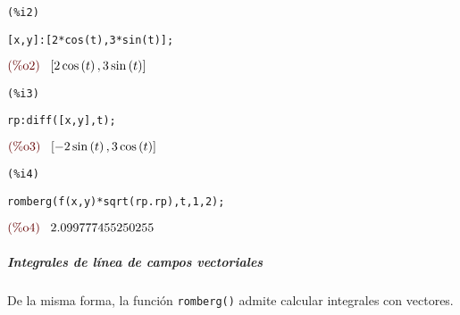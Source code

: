 \documentclass[12pt]{article}
\begin{document}
\noindent
\begin{minipage}[t]{8ex}{\color{red}\bf
\begin{verbatim}
(%i2) 
\end{verbatim}}
\end{minipage}
\begin{minipage}[t]{\textwidth}{\color{blue}
\begin{verbatim}
[x,y]:[2*cos(t),3*sin(t)];
\end{verbatim}}
\end{minipage}
\begin{math}\displaystyle
\parbox{8ex}{\color{labelcolor}(\%o2) }
[2\,\mathrm{cos}\left( t\right) ,3\,\mathrm{sin}\left( t\right) ]
\end{math}


\noindent
\begin{minipage}[t]{8ex}{\color{red}\bf
\begin{verbatim}
(%i3) 
\end{verbatim}}
\end{minipage}
\begin{minipage}[t]{\textwidth}{\color{blue}
\begin{verbatim}
rp:diff([x,y],t);
\end{verbatim}}
\end{minipage}
\begin{math}\displaystyle
\parbox{8ex}{\color{labelcolor}(\%o3) }
[-2\,\mathrm{sin}\left( t\right) ,3\,\mathrm{cos}\left( t\right) ]
\end{math}


\noindent
\begin{minipage}[t]{8ex}{\color{red}\bf
\begin{verbatim}
(%i4) 
\end{verbatim}}
\end{minipage}
\begin{minipage}[t]{\textwidth}{\color{blue}
\begin{verbatim}
romberg(f(x,y)*sqrt(rp.rp),t,1,2);
\end{verbatim}}
\end{minipage}
\begin{math}\displaystyle
\parbox{8ex}{\color{labelcolor}(\%o4) }
2.099777455250255
\end{math}

\subparagraph{Integrales de línea de campos vectoriales} De la misma forma, la función \texttt{romberg()} admite calcular integrales con vectores.
\end{document}
